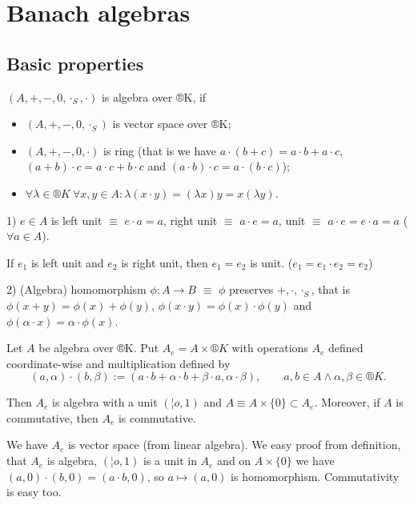 \documentclass[12pt]{article}					%
\begin{document}

%

\section{Banach algebras}
\subsection{Basic properties}
\begin{definice}[Algebra]
	$(A, +, -, 0, ·_S, ·)$ is algebra over ®K, if

	\begin{itemize}
		\item $(A, +, -, 0, ·_S)$ is vector space over ®K;
		\item $(A, +, -, 0, ·)$ is ring (that is we have $a·(b + c) = a·b + a·c$, $(a + b)·c = a·c + b·c$ and $(a·b)·c = a·(b·c)$);
		\item $\forall \lambda \in ®K\ \forall x, y \in A: \lambda(x·y) = (\lambda x)y = x(\lambda y)$.
	\end{itemize}
\end{definice}

\begin{dusledek}
	1) $e \in A$ is left unit $≡$ $e·a = a$, right unit $≡$ $a·e = a$, unit $≡$ $a·e = e·a = a$ ($\forall a \in A$).

	If $e_1$ is left unit and $e_2$ is right unit, then $e_1 = e_2$ is unit. ($e_1 = e_1·e_2 = e_2$)

	2) (Algebra) homomorphism $\phi: A \rightarrow B$ $≡$ $\phi$ preserves $+, ·, ·_S$, that is $\phi(x + y) = \phi(x) + \phi(y)$, $\phi(x·y) = \phi(x)·\phi(y)$ and $\phi(\alpha·x) = \alpha·\phi(x)$.
\end{dusledek}

\begin{tvrzeni}
	Let $A$ be algebra over ®K. Put $A_e = A \times ®K$ with operations $A_e$ defined coordinate-wise and multiplication defined by
	$$ (a, \alpha)·(b, \beta) := (a·b + \alpha·b + \beta·a, \alpha·\beta), \qquad a, b \in A \land \alpha, \beta \in ®K. $$

	Then $A_e$ is algebra with a unit $(¦o, 1)$ and $A ≡ A \times \{0\} \subset A_e$. Moreover, if $A$ is commutative, then $A_e$ is commutative.

	\begin{dukazin}
		We have $A_e$ is vector space (from linear algebra). We easy proof from definition, that $A_e$ is algebra, $(¦o, 1)$ is a unit in $A_e$ and on $A \times \{0\}$ we have $(a, 0)·(b, 0) = (a·b, 0)$, so $a \mapsto (a, 0)$ is homomorphism. Commutativity is easy too.
	\end{dukazin}
\end{tvrzeni}
\end{document}
